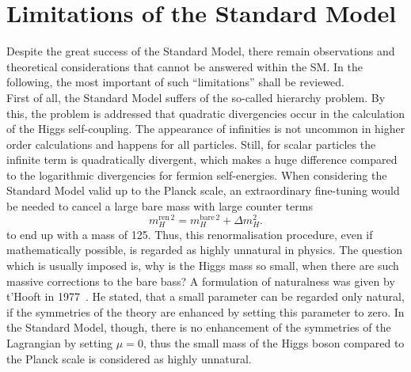 \section{Limitations of the Standard Model}
\label{sec:Limitations}
Despite the great success of the Standard Model, there remain observations and theoretical considerations that cannot be answered within the SM.
In the following, the most important of such ``limitations'' shall be reviewed.\\

First of all, the Standard Model suffers of the so-called hierarchy problem.
By this, the problem is addressed that quadratic divergencies occur in the calculation of the Higgs self-coupling.
The appearance of infinities is not uncommon in higher order calculations and happens for all particles. 
Still, for scalar particles the infinite term is quadratically divergent, which makes a huge difference compared to the logarithmic divergencies for fermion self-energies. 
When considering the Standard Model valid up to the Planck scale, an extraordinary fine-tuning would be needed to cancel a large bare mass with large counter terms 
\begin{equation}
 m^{\text{ren}\,2}_H = m_H^{\text{bare}\,2} + \Delta m^2_H.
\end{equation}
to end up with a mass of 125\gev.
Thus, this renormalisation procedure, even if mathematically possible, is regarded as highly unnatural in physics.
The question which is usually imposed is, why is the Higgs mass so small, when there are such massive corrections to the bare bass?
A formulation of naturalness was given by t'Hooft in 1977~\cite{bib:Naturalness_tHooft}. 
He stated, that a small parameter can be regarded only natural, if the symmetries of the theory are enhanced by setting this parameter to zero.
In the Standard Model, though,  there is no enhancement of the symmetries of the Lagrangian by setting $\mu=0$, thus the small mass of the Higgs boson compared to the Planck scale is considered as highly unnatural.\\




